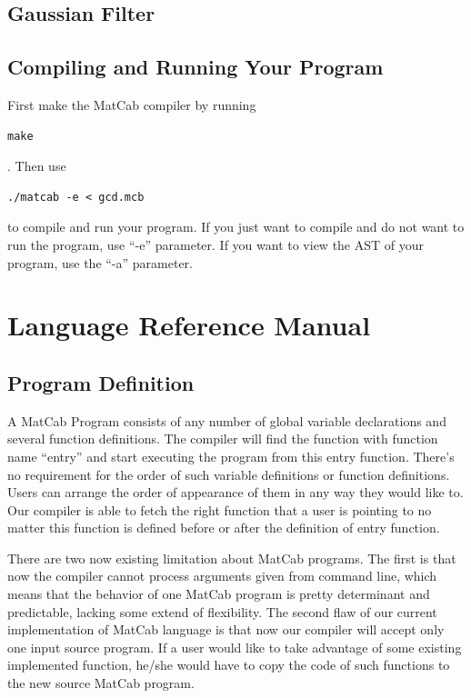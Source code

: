 \documentclass[12pt]{article} %
\begin{document}
\subsection{Gaussian Filter}


\subsection{Compiling and Running Your Program}
First make the MatCab compiler by running \begin{verbatim}make\end{verbatim}. Then use  \begin{verbatim}./matcab -e < gcd.mcb\end{verbatim} to compile and run your program. If you just want to compile and do not want to run the program, use ``-e'' parameter. If you want to view the AST of your program, use the ``-a'' parameter.

\section{Language Reference Manual}
\subsection{Program Definition} %
A MatCab Program consists of any number of global variable declarations and several function definitions. The compiler will find the function with function name ``entry'' and start executing the program from this entry function. There’s no requirement for the order of such variable definitions or function definitions. Users can arrange the order of appearance of them in any way they would like to. Our compiler is able to fetch the right function that a user is pointing to no matter this function is defined before or after the definition of entry function.

There are two now existing limitation about MatCab programs. The first is that now the compiler cannot process arguments given from command line, which means that the behavior of one MatCab program is pretty determinant and predictable, lacking some extend of flexibility. The second flaw of our current implementation of MatCab language is that now our compiler will accept only one input source program. If a user would like to take advantage of some existing implemented function, he/she would have to copy the code of such functions to the new source MatCab program.
\end{document}
